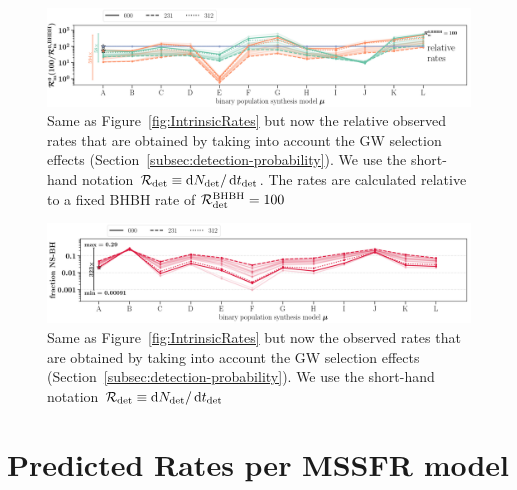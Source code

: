\documentclass[twocolumn]{aastex63}
\newcommand\rate{\mathcal{R}}
\newcommand{\tdet}{\ensuremath{{t}_{\rm{det}}}\xspace}
\newcommand{\Ndet}{\ensuremath{{N}_{\rm{det}}}\xspace}
\newcommand*\diff{\mathop{}\!\mathrm{d}}
\begin{document}
%
\begin{figure}
    \centering
    \includegraphics[width=1.0\textwidth]{../PlottingScripts/8_PredictedRates_BPS_and_MSSFR_variations/RatesRatios_intrinsic.png} 
    \caption{Same as Figure~\ref{fig:IntrinsicRates} but now the relative observed rates that are obtained by taking into account the \ac{GW} selection effects (Section~\ref{subsec:detection-probability}). We use the short-hand notation $\rate_{\rm{det}} \equiv \diff \Ndet / \diff \tdet$. The rates are calculated relative to a fixed \ac{BHBH} rate of   $\rate_{\rm{det}}^{\rm{BHBH}}=100$   }%
    \label{fig:ObservedRatesRatiosBBHBNSBHNS-intrinsic}
\end{figure}
%



%
\begin{figure}
    \centering
\includegraphics[width=1.0\textwidth]{../PlottingScripts/8_PredictedRates_BPS_and_MSSFR_variations/NSBHRatios_intrinsicpercentage.png} 
    \caption{Same as Figure~\ref{fig:IntrinsicRates} but now the observed rates that are obtained by taking into account the \ac{GW} selection effects (Section~\ref{subsec:detection-probability}). We use the short-hand notation $\rate_{\rm{det}} \equiv \diff \Ndet / \diff \tdet$}%
    \label{fig:IntrinsicRatesNSBH}
\end{figure}
%




\section{Predicted Rates per MSSFR model}
\label{sec:app-predicted-rates-MSSFR}
\end{document}
